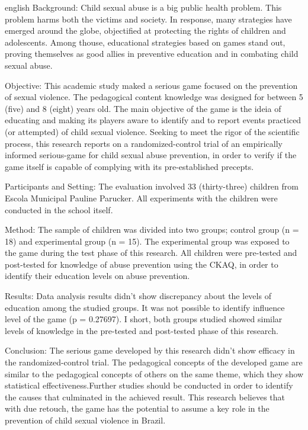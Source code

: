 
\begin{resumo}[Abstract]
 \begin{otherlanguage*}{english}
    Background: Child sexual abuse is a big public health problem. This problem harms both the victims and society. In response, many strategies have emerged around the globe, objectified at protecting the rights of children and adolescents. Among thouse,  educational strategies based on games stand out, proving themselves as good allies in preventive education and in combating child sexual abuse.

    Objective: This academic study maked a serious game focused on the prevention of sexual violence. The pedagogical content knowledge was designed for between 5 (five) and 8 (eight) years old. The main objective of the game is the ideia of educating and making its players aware to identify and to report events practiced (or attempted) of child sexual violence. Seeking to meet the rigor of the scientific process, this research reports on a randomized-control trial of an empirically informed serious-game for child sexual abuse prevention, in order to verify if the game itself is capable of complying with its pre-established precepts.

    Participants and Setting: The evaluation involved 33 (thirty-three) children from Escola Municipal Pauline Parucker. All experiments with the children were conducted in the school itself.%

    Method: The sample of children was divided into two groups; control group (n = 18) and experimental group (n = 15). The experimental group was exposed to the game during the test phase of this research. All children were pre-tested and post-tested for knowledge of abuse prevention using the \acf{CKAQ}, in order to identify their education levels on abuse prevention.

    Results: Data analysis results didn't show discrepancy about the levels of education among the studied groups.  It was not possible to identify influence level of the game (p = 0.27697). I short, both groups studied showed similar levels of knowledge in the pre-tested and post-tested phase of this research. 
    
    Conclusion: The serious game developed by this research didn't show efficacy in the randomized-control trial. The pedagogical concepts of the developed game are similar to the pedagogical concepts of others on the same theme, which they show statistical effectiveness.Further studies should be conducted in order to identify the causes that culminated in the achieved result. This research believes that with due retouch, the game has the potential to assume a key role in the prevention of child sexual violence in Brazil.
    


\end{otherlanguage*}
\end{resumo}
